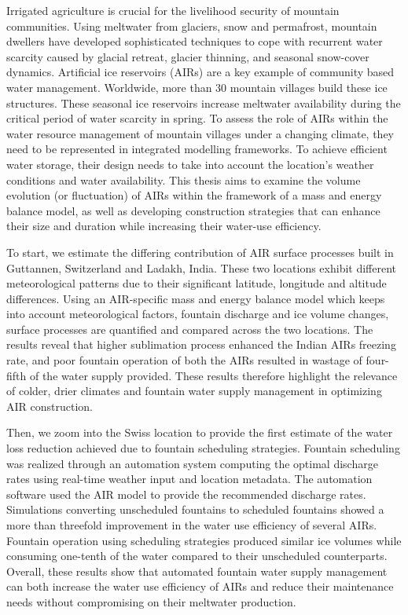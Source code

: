 %
\label{sec:abstract}

Irrigated agriculture is crucial for the livelihood security of mountain communities. Using meltwater from
glaciers, snow and permafrost, mountain dwellers have developed sophisticated techniques to cope with recurrent
water scarcity caused by glacial retreat, glacier thinning, and seasonal snow-cover dynamics. Artificial ice
reservoirs (AIRs) are a key example of community based water management. Worldwide, more than 30 mountain
villages build these ice structures. These seasonal ice reservoirs increase meltwater availability during the
critical period of water scarcity in spring. To assess the role of AIRs within the water resource management of
mountain villages under a changing climate, they need to be represented in integrated modelling frameworks. To
achieve efficient water storage, their design needs to take into account the location's weather conditions and
water availability. This thesis aims to examine the volume evolution (or fluctuation) of AIRs within the
framework of a mass and energy balance model, as well as developing construction strategies that can enhance
their size and duration while increasing their water-use efficiency. 

To start, we estimate the differing contribution of AIR surface processes built in Guttannen, Switzerland and
Ladakh, India. These two locations exhibit different meteorological patterns due to their significant latitude,
longitude and altitude differences. Using an AIR-specific mass and energy balance model which keeps into account
meteorological factors, fountain discharge and ice volume changes, surface processes are quantified and compared
across the two locations. The results reveal that higher sublimation process enhanced the Indian AIRs freezing
rate, and poor fountain operation of both the AIRs resulted in wastage of four-fifth of the water supply
provided. These results therefore highlight the relevance of colder, drier climates and fountain water supply
management in optimizing  AIR construction.  

Then, we zoom into the Swiss location to provide the first estimate of the water loss reduction achieved due to
fountain scheduling strategies. Fountain scheduling was realized through an automation system computing the
optimal discharge rates using real-time weather input and location metadata. The automation software used the
AIR model to provide the recommended discharge rates. Simulations converting unscheduled fountains to scheduled
fountains showed a more than threefold improvement in the water use efficiency of several AIRs. Fountain
operation using scheduling strategies produced similar ice volumes while consuming one-tenth of the water
compared to their unscheduled counterparts.  Overall, these results show that automated fountain water supply
management can both increase the water use efficiency of AIRs and reduce their maintenance needs without
compromising on their meltwater production.

